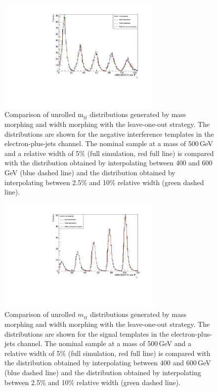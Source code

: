 \begin{figure}[!Hhtb]
\centering
\includegraphics[width=0.7\textwidth,keepaspectratio=true]{fig/chapt8/morphing/mass_morph_ejets_neg-int-5pc-M500.pdf}
\caption{Comparison of unrolled m$_{t\bar t}$ distributions generated by mass morphing and width morphing with the leave-one-out strategy. The distributions are shown for the negative interference templates in the electron-plus-jets channel. The nominal sample at a mass of 500\,GeV and a relative width of 5\% (full simulation, red full line) is compared with the distribution obtained by interpolating between 400 and 600\,GeV (blue dashed line) and the distribution obtained by interpolating between 2.5\% and 10\% relative width (green dashed line).}
\label{fig:morph_mass_ele_negint_500_5}
\end{figure}
\begin{figure}[!Hhtb]
\centering
\includegraphics[width=0.7\textwidth,keepaspectratio=true]{fig/chapt8/morphing/mass_morph_ll_pos-sgn-5pc-M500.pdf}
\caption{Comparison of unrolled $m_{t\bar t}$ distributions generated by mass morphing and width morphing with the leave-one-out strategy. The distributions are shown for the signal templates in the electron-plus-jets channel. The nominal sample at a mass of 500\,GeV and a relative width of 5\% (full simulation, red full line) is compared with the distribution obtained by interpolating between 400 and 600\,GeV (blue dashed line) and the distribution obtained by interpolating between 2.5\% and 10\% relative width (green dashed line).}
\label{fig:morph_mass_ll_sgn_500_5}
\end{figure}

